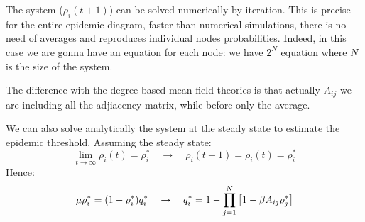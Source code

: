 \documentclass[../main/main.tex]{subfiles}
\begin{document}

The system (\( \rho _i (t+1) \)) can be solved numerically by iteration. This is precise for the entire epidemic diagram, faster than numerical simulations, there is no need of averages and reproduces individual nodes probabilities.
Indeed, in this case we are gonna have an equation for each node: we have \( 2^N \) equation where \( N \) is the size of the system.

\begin{remark}
The difference with the degree based mean field theories is that actually \( A_{ij} \) we are including all the adjiacency matrix, while before only the average.
\end{remark}


We can also solve analytically the system at the steady state to estimate the epidemic threshold. Assuming the steady state:
\begin{equation*}
  \lim_{t \rightarrow \infty } \rho _i (t) = \rho _i ^* \quad \rightarrow \quad \rho _i (t+1) = \rho _i (t) = \rho _i^*
\end{equation*}
Hence:
\begin{equation}
  \mu \rho _i^* = (1- \rho _i^*) q_i^* \quad \rightarrow \quad q_i^* = 1 - \prod_{j=1}^{N} \qty[1- \beta A_{ij} \rho _j^*]
\end{equation}
\end{document}
